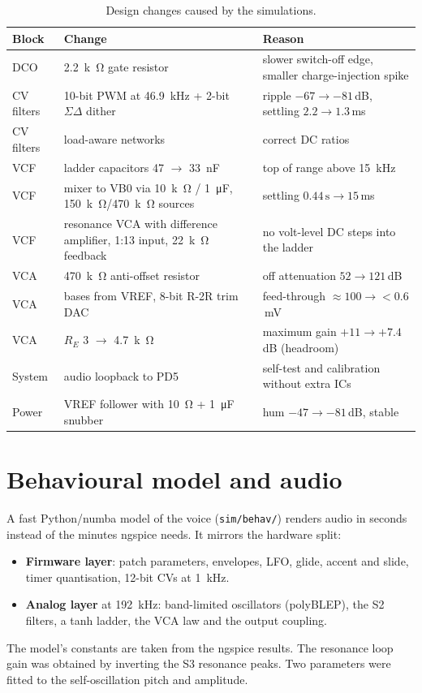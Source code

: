 \documentclass[11pt,a4paper]{article}
\newcommand{\file}[1]{\texttt{#1}}
\begin{document}
\begin{table}[h]
\centering\small
\caption{Design changes caused by the simulations.}\label{tab:changes}
\begin{tabularx}{\textwidth}{@{}l X X@{}}
\toprule
Block & Change & Reason \\
\midrule
DCO & \SI{2.2}{k\ohm} gate resistor & slower switch-off edge, smaller charge-injection spike \\
CV filters & 10-bit PWM at \SI{46.9}{kHz} + 2-bit $\Sigma\Delta$ dither & ripple $-67 \to -81$\,dB, settling $2.2 \to 1.3$\,ms \\
CV filters & load-aware networks & correct DC ratios \\
VCF & ladder capacitors 47 $\to$ \SI{33}{nF} & top of range above \SI{15}{kHz} \\
VCF & mixer to VB0 via \SI{10}{k\ohm} / \SI{1}{\micro F}, \SI{150}{k\ohm}/\SI{470}{k\ohm} sources & settling $0.44\,\mathrm{s} \to 15$\,ms \\
VCF & resonance VCA with difference amplifier, 1:13 input, \SI{22}{k\ohm} feedback & no volt-level DC steps into the ladder \\
VCA & \SI{470}{k\ohm} anti-offset resistor & off attenuation $52 \to 121$\,dB \\
VCA & bases from VREF, 8-bit R-2R trim DAC & feed-through $\approx 100 \to < 0.6$\,mV \\
VCA & $R_E$ 3 $\to$ \SI{4.7}{k\ohm} & maximum gain $+11 \to +7.4$\,dB (headroom) \\
System & audio loopback to PD5 & self-test and calibration without extra ICs \\
Power & VREF follower with \SI{10}{\ohm} + \SI{1}{\micro F} snubber & hum $-47 \to -81$\,dB, stable \\
\bottomrule
\end{tabularx}
\end{table}

\section{Behavioural model and audio}\label{sec:behav}
A fast Python/numba model of the voice (\file{sim/behav/}) renders audio in seconds instead of the minutes
ngspice needs. It mirrors the hardware split:
\begin{itemize}
  \item \textbf{Firmware layer}: patch parameters, envelopes, LFO, glide, accent and slide, timer
    quantisation, 12-bit CVs at \SI{1}{kHz}.
  \item \textbf{Analog layer} at \SI{192}{kHz}: band-limited oscillators (polyBLEP), the S2 filters, a
    tanh ladder, the VCA law and the output coupling.
\end{itemize}
The model's constants are taken from the ngspice results. The resonance loop gain was obtained by inverting
the S3 resonance peaks. Two parameters were fitted to the self-oscillation pitch and amplitude.
\end{document}

